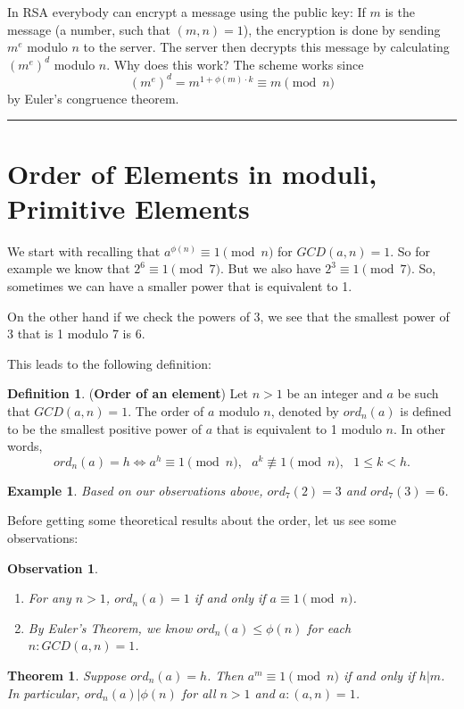 \documentclass[12pt]{article}
\theoremstyle{plain}
\newtheorem{example}{Example}
\newtheorem{observation}{Observation}
\newtheorem{theorem}{Theorem}
\theoremstyle{definition}
\newtheorem{definition}{Definition}
\theoremstyle{remark}
\begin{document}
\bigskip
\noindent
In RSA everybody can encrypt a message using the public key: If $m$ is the message (a number, such that $(m,n)=1$), the encryption is done by sending $m^e$ modulo $n$ to the server. The server then decrypts this message by calculating $(m^e)^d$ modulo $n$. Why does this work?
The scheme works since
$$(m^e)^d = m^{1+\phi(m)\cdot k} \equiv m \pmod{n}$$
by Euler's congruence theorem.

\bigskip
\hrule
\section{Order of Elements in moduli, Primitive Elements}
We start with recalling that $a^{\phi(n)} \equiv 1 \pmod{n}$ for $GCD(a,n)=1$. So for example we know that $2^6 \equiv 1 \pmod{7}$. But we also have $2^3\equiv 1 \pmod{7}$. So, sometimes we can have a smaller power that is equivalent to 1.

On the other hand if we check the powers of 3, we see that the smallest power of 3 that is 1 modulo 7 is 6.

This leads to the following definition:
\begin{definition} ({\bf Order of an element}) Let $n>1$ be an integer and $a$ be such that $GCD(a,n)=1$. The order of $a$ modulo $n$, denoted by $ord_n(a)$ is defined to be the smallest positive power of $a$ that is equivalent to 1 modulo $n$. In other words,
$$ord_n(a)=h \Leftrightarrow a^h \equiv 1 \pmod{n}, \:\:\: a^k\not \equiv 1 \pmod{n}, \:\:\:  1\leq k < h.$$
\end{definition}
\begin{example}
Based on our observations above, $ord_7(2)=3$ and $ord_7(3)=6$.
\end{example}

\bigskip
\noindent
Before getting some theoretical results about the order, let us see some observations:
\begin{observation}
\begin{enumerate}
    \item For any $n>1$, $ord_n(a)=1$ if and only if $a\equiv 1 \pmod{n}$.
    \item By Euler's Theorem, we know $ord_n(a) \leq \phi(n)$ for each $n:GCD(a,n)=1$.
    \end{enumerate}
\end{observation}
\begin{theorem}
Suppose $ord_n(a)=h$. Then $a^m\equiv 1 \pmod{n}$ if and only if $h|m$. In particular, $ord_n(a)|\phi(n)$ for all $n>1$ and $a: (a,n)=1$.
\end{theorem}
\end{document}
